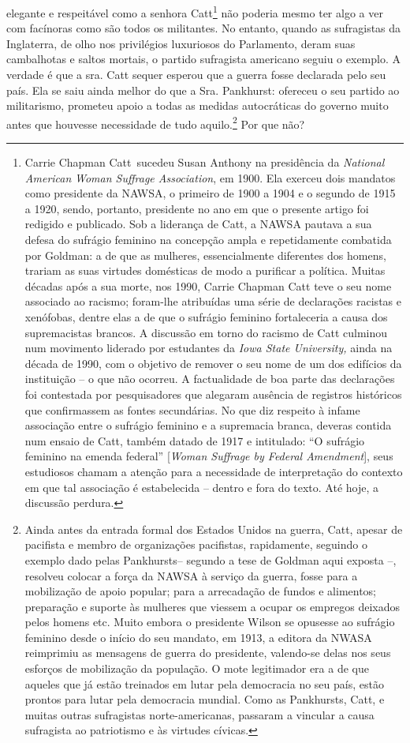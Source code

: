 elegante e respeitável como a senhora Catt\footnote{Carrie Chapman
  Catt~sucedeu Susan Anthony na presidência da \emph{National American}
  \emph{Woman Suffrage Association}, em 1900. Ela exerceu dois mandatos
  como presidente da NAWSA, o primeiro de 1900 a 1904 e o segundo de
  1915 a 1920, sendo, portanto, presidente no ano em que o presente
  artigo foi redigido e publicado. Sob a liderança de Catt, a NAWSA
  pautava a sua defesa do sufrágio feminino na concepção ampla e
  repetidamente combatida por Goldman: a de que as mulheres,
  essencialmente diferentes dos homens, trariam as suas virtudes
  domésticas de modo a purificar a política. Muitas décadas após a sua
  morte, nos 1990, Carrie Chapman Catt teve o seu nome associado ao
  racismo; foram-lhe atribuídas uma série de declarações racistas e
  xenófobas, dentre elas a de que o sufrágio feminino fortaleceria a
  causa dos supremacistas brancos. A discussão em torno do racismo de
  Catt culminou num movimento liderado por estudantes da \emph{Iowa
  State University,} ainda na década de 1990, com o objetivo de remover
  o seu nome de um dos edifícios da instituição -- o que não ocorreu. A
  factualidade de boa parte das declarações foi contestada por
  pesquisadores que alegaram ausência de registros históricos que
  confirmassem as fontes secundárias. No que diz respeito à infame
  associação entre o sufrágio feminino e a supremacia branca, deveras
  contida num ensaio de Catt, também datado de 1917 e intitulado: ``O
  sufrágio feminino na emenda federal'' {[}\emph{Woman Suffrage by
  Federal Amendment}{]}, seus estudiosos chamam a atenção para a
  necessidade de interpretação do contexto em que tal associação é
  estabelecida -- dentro e fora do texto. Até hoje, a discussão perdura.}
não poderia mesmo ter algo a ver com facínoras como são todos os
militantes. No entanto, quando as sufragistas da Inglaterra, de olho nos
privilégios luxuriosos do Parlamento, deram suas cambalhotas e saltos
mortais, o partido sufragista americano seguiu o exemplo. A verdade é
que a sra. Catt sequer esperou que a guerra fosse declarada pelo seu
país. Ela se saiu ainda melhor do que a Sra. Pankhurst: ofereceu o seu
partido ao militarismo, prometeu apoio a todas as medidas autocráticas
do governo muito antes que houvesse necessidade de tudo
aquilo.\footnote{Ainda antes da entrada formal dos Estados Unidos na
  guerra, Catt, apesar de pacifista e membro de organizações pacifistas,
  rapidamente, seguindo o exemplo dado pelas Pankhursts-- segundo a tese
  de Goldman aqui exposta --, resolveu colocar a força da NAWSA à
  serviço da guerra, fosse para a mobilização de apoio popular; para a
  arrecadação de fundos e alimentos; preparação e suporte às mulheres
  que viessem a ocupar os empregos deixados pelos homens etc. Muito
  embora o presidente Wilson se opusesse ao sufrágio feminino desde o
  início do seu mandato, em 1913, a editora da NWASA reimprimiu as
  mensagens de guerra do presidente, valendo-se delas nos seus esforços
  de mobilização da população. O mote legitimador era a de que aqueles
  que já estão treinados em lutar pela democracia no seu país, estão
  prontos para lutar pela democracia mundial. Como as Pankhursts, Catt,
  e muitas outras sufragistas norte-americanas, passaram a vincular a
  causa sufragista ao patriotismo e às virtudes cívicas.} Por que não?
